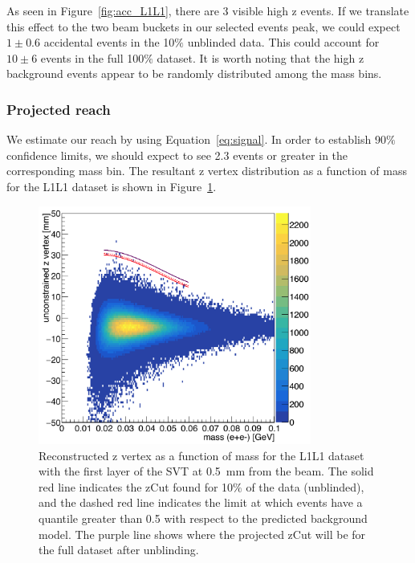 \documentclass[twoside]{article}
\begin{document}
As seen in Figure~\ref{fig:acc_L1L1}, there are 3 visible high z events. If we translate this effect to the two beam buckets in our selected events peak, we could expect $1\pm0.6$ accidental events in the 10$\%$ unblinded data. This could account for $10\pm6$ events in the full 100$\%$ dataset. It is worth noting that the high z background events appear to be randomly distributed among the mass bins.

\subsubsection{Projected reach}

We estimate our reach by using Equation~\eqref{eq:signal}. In order to establish 90$\%$ confidence limits, we should expect to see 2.3 events or greater in the corresponding mass bin. The resultant z vertex distribution as a function of mass for the L1L1 dataset is shown in Figure~\ref{fig:zVm_L1L1}.

\begin{figure}[H]
  \centering
     \includegraphics[width=0.8\textwidth]{plots/zVm_L1L1_0p5.png}
  \caption{Reconstructed z vertex as a function of mass for the L1L1 dataset with the first layer of the SVT at 0.5~mm from the beam. The solid red line indicates the zCut found for 10$\%$ of the data (unblinded), and the dashed red line indicates the limit at which events have a quantile greater than 0.5 with respect to the predicted background model. The purple line shows where the projected zCut will be for the full dataset after unblinding.}
  \label{fig:zVm_L1L1}
\end{figure}
\end{document}
